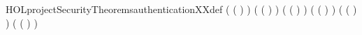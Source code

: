 \begin{SaveVerbatim}{HOLprojectSecurityTheoremsauthenticationXXdef}
   ( (  ) \HOLSymConst{\HOLTokenEquiv{}} ) \HOLSymConst{\HOLTokenConj{}}
   ( (  ) \HOLSymConst{\HOLTokenEquiv{}} ) \HOLSymConst{\HOLTokenConj{}}
   ( (  ) \HOLSymConst{\HOLTokenEquiv{}} ) \HOLSymConst{\HOLTokenConj{}}
   ( (  ) \HOLSymConst{\HOLTokenEquiv{}} ) \HOLSymConst{\HOLTokenConj{}}
   ( (  ) \HOLSymConst{\HOLTokenEquiv{}} ) \HOLSymConst{\HOLTokenConj{}}
   ( (  ) \HOLSymConst{\HOLTokenEquiv{}} )
\end{SaveVerbatim}
\newcommand{\HOLprojectSecurityTheoremsauthenticationXXdef}{\UseVerbatim{HOLprojectSecurityTheoremsauthenticationXXdef}}
